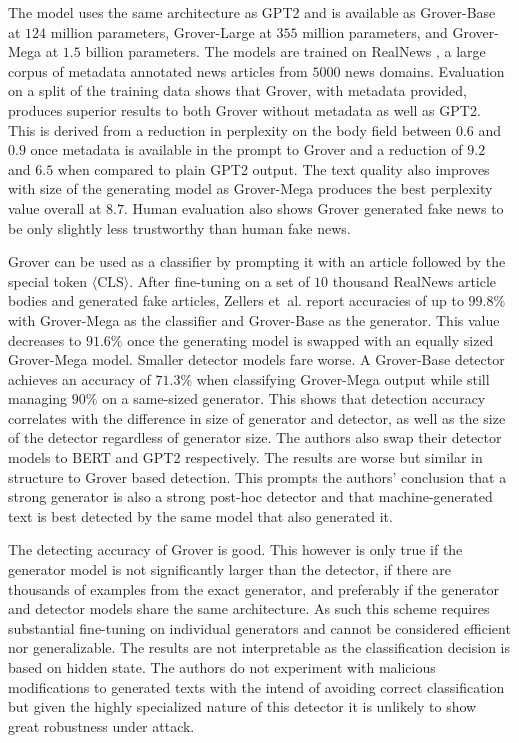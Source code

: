     The model uses the same architecture as GPT2 \cite{radford2019language} and is available as Grover-Base at $124$ million parameters, Grover-Large at $355$ million parameters, and Grover-Mega at $1.5$ billion parameters.
    The models are trained on RealNews \cite{zellers2020defending}, a large corpus of metadata annotated news articles from $5000$ news domains.
    Evaluation on a split of the training data shows that Grover, with metadata provided, produces superior results to both Grover without metadata as well as GPT2.
    This is derived from a reduction in perplexity on the body field between $0.6$ and $0.9$ once metadata is available in the prompt to Grover and a reduction of $9.2$ and $6.5$ when compared to plain GPT2 output.
    The text quality also improves with size of the generating model as Grover-Mega produces the best perplexity value overall at $8.7$.
    Human evaluation also shows Grover generated fake news to be only slightly less trustworthy than human fake news.

    Grover can be used as a classifier by prompting it with an article followed by the special token $\langle \mathrm{CLS} \rangle$.
    After fine-tuning on a set of $10$ thousand RealNews article bodies and generated fake articles, Zellers et~al. \cite{zellers2020defending} report accuracies of up to $99.8\%$ with Grover-Mega as the classifier and Grover-Base as the generator.
    This value decreases to $91.6\%$ once the generating model is swapped with an equally sized Grover-Mega model.
    Smaller detector models fare worse.
    A Grover-Base detector achieves an accuracy of $71.3\%$ when classifying Grover-Mega output while still managing $90\%$ on a same-sized generator.
    This shows that detection accuracy correlates with the difference in size of generator and detector, as well as the size of the detector regardless of generator size.
    The authors also swap their detector models to BERT \cite{devlin2019bert} and GPT2 \cite{radford2019language} respectively.
    The results are worse but similar in structure to Grover based detection.
    This prompts the authors' conclusion that a strong generator is also a strong post-hoc detector and that machine-generated text is best detected by the same model that also generated it.

    \begin{analysis}
        The detecting accuracy of Grover is good.
        This however is only true if the generator model is not significantly larger than the detector, if there are thousands of examples from the exact generator, and preferably if the generator and detector models share the same architecture.
        As such this scheme requires substantial fine-tuning on individual generators and cannot be considered efficient nor generalizable.
        The results are not interpretable as the classification decision is based on hidden state.
        The authors do not experiment with malicious modifications to generated texts with the intend of avoiding correct classification but given the highly specialized nature of this detector it is unlikely to show great robustness under attack.
    \end{analysis}

